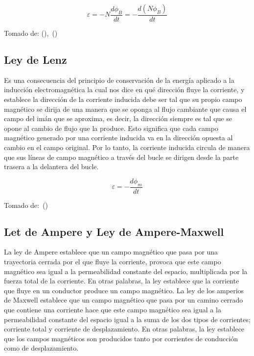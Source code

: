 \documentclass[twocolumn, 12pt]{article}
\begin{document}
{\Large
\begin{equation}
	\varepsilon = - N \frac{d\phi_B}{dt} = - \frac{d(N\phi_B)}{dt}
\end{equation}
}

Tomado de:\hfill \break{}
(\cite{LeyFaraday}),~(\cite{FaradayLawKhanAcademy})

\subsection*{Ley de Lenz}

Es una consecuencia del principio de conservación de la
energía aplicado a la inducción electromagnética la cual
nos dice en qué dirección fluye la corriente, y establece
la dirección de la corriente inducida debe ser tal que su
propio campo magnético se dirija de una manera que se
oponga al flujo cambiante que causa el campo del imán que
se aproxima, es decir, la dirección siempre es tal que se
opone al cambio de flujo que la produce. Esto significa que
cada campo magnético generado por una corriente inducida va
en la dirección opuesta al cambio en el campo original. Por
lo tanto, la corriente inducida circula de manera que sus
líneas de campo magnético a través del bucle se dirigen
desde la parte trasera a la delantera del bucle.

	{\Large
		\begin{equation}
			\varepsilon = - \frac{d\phi_m}{dt}
		\end{equation}
	}

Tomado de:~(\cite{FaradayLawKhanAcademy})

\subsection*{Let de Ampere y Ley de Ampere-Maxwell}

La ley de Ampere establece que un campo magnético que pasa
por una trayectoria cerrada por el que fluye la corriente,
provoca que este campo magnético sea igual a la
permeabilidad constante del espacio, multiplicada por la
fuerza total de la corriente. En otras palabras, la ley
establece que la corriente que fluye en un conductor
produce un campo magnético. La ley de los amperios de
Maxwell establece que un campo magnético que pasa por un
camino cerrado que contiene una corriente hace que este
campo magnético sea igual a la permeabilidad constante del
espacio igual a la suma de los dos tipos de corrientes;
corriente total y corriente de desplazamiento. En otras
palabras, la ley establece que los campos magnéticos son
producidos tanto por corrientes de conducción como de
desplazamiento.
\end{document}
